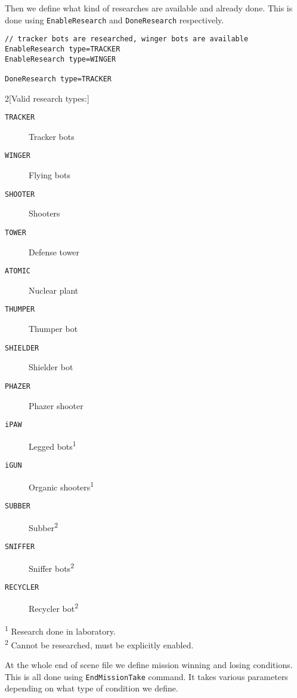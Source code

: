 Then we define what kind of researches are available and already done. This is done using \texttt{EnableResearch} and \texttt{DoneResearch} respectively.

\begin{lstlisting}[style=scene]
// tracker bots are researched, winger bots are available
EnableResearch type=TRACKER
EnableResearch type=WINGER

DoneResearch type=TRACKER
\end{lstlisting}

\begin{multicols}{2}[Valid research types:]

\begin{description}
    \item[\texttt{TRACKER}] Tracker bots
    \item[\texttt{WINGER}] Flying bots
    \item[\texttt{SHOOTER}] Shooters
    \item[\texttt{TOWER}] Defense tower
    \item[\texttt{ATOMIC}] Nuclear plant
    \item[\texttt{THUMPER}] Thumper bot
    \item[\texttt{SHIELDER}] Shielder bot
    \item[\texttt{PHAZER}] Phazer shooter
    \item[\texttt{iPAW}] Legged bots\textsuperscript{1}
    \item[\texttt{iGUN}] Organic shooters\textsuperscript{1}
    \item[\texttt{SUBBER}] Subber\textsuperscript{2}
    \item[\texttt{SNIFFER}] Sniffer bots\textsuperscript{2}
    \item[\texttt{RECYCLER}] Recycler bot\textsuperscript{2}
\end{description}

\end{multicols}

\textsuperscript{1} Research done in laboratory. \\
\textsuperscript{2} Cannot be researched, must be explicitly enabled.

At the whole end of scene file we define mission winning and losing conditions. This is all done using \texttt{EndMissionTake} command. It takes various parameters depending on what type of condition we define.


